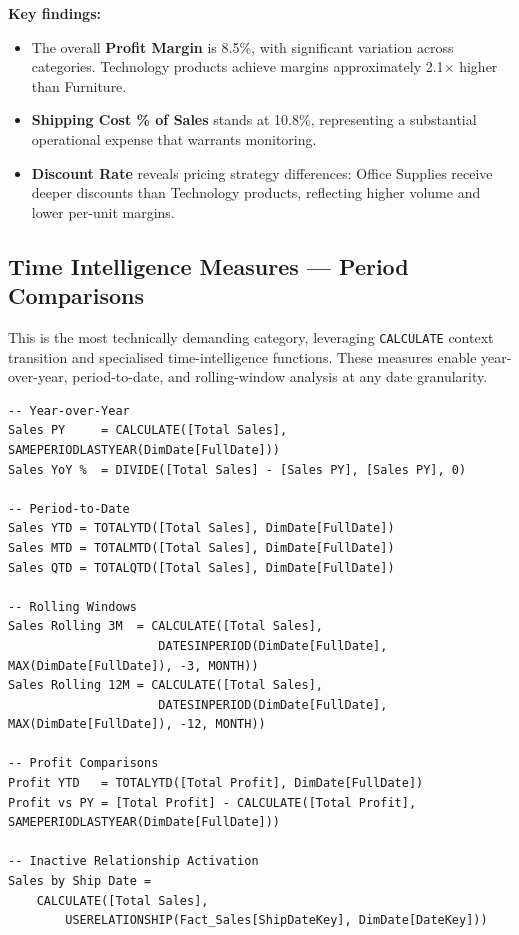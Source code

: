 \documentclass[11pt,a4paper]{article}
\begin{document}
\textbf{Key findings:}
\begin{itemize}
    \item The overall \textbf{Profit Margin} is 8.5\%, with significant variation across categories. Technology products achieve margins approximately 2.1$\times$ higher than Furniture.
    \item \textbf{Shipping Cost \% of Sales} stands at 10.8\%, representing a substantial operational expense that warrants monitoring.
    \item \textbf{Discount Rate} reveals pricing strategy differences: Office Supplies receive deeper discounts than Technology products, reflecting higher volume and lower per-unit margins.
\end{itemize}

\subsection{Time Intelligence Measures --- Period Comparisons}

This is the most technically demanding category, leveraging \texttt{CALCULATE} context transition and specialised time-intelligence functions. These measures enable year-over-year, period-to-date, and rolling-window analysis at any date granularity.

\begin{lstlisting}
-- Year-over-Year
Sales PY     = CALCULATE([Total Sales], SAMEPERIODLASTYEAR(DimDate[FullDate]))
Sales YoY %  = DIVIDE([Total Sales] - [Sales PY], [Sales PY], 0)

-- Period-to-Date
Sales YTD = TOTALYTD([Total Sales], DimDate[FullDate])
Sales MTD = TOTALMTD([Total Sales], DimDate[FullDate])
Sales QTD = TOTALQTD([Total Sales], DimDate[FullDate])

-- Rolling Windows
Sales Rolling 3M  = CALCULATE([Total Sales],
                     DATESINPERIOD(DimDate[FullDate], MAX(DimDate[FullDate]), -3, MONTH))
Sales Rolling 12M = CALCULATE([Total Sales],
                     DATESINPERIOD(DimDate[FullDate], MAX(DimDate[FullDate]), -12, MONTH))

-- Profit Comparisons
Profit YTD   = TOTALYTD([Total Profit], DimDate[FullDate])
Profit vs PY = [Total Profit] - CALCULATE([Total Profit], SAMEPERIODLASTYEAR(DimDate[FullDate]))

-- Inactive Relationship Activation
Sales by Ship Date =
    CALCULATE([Total Sales],
        USERELATIONSHIP(Fact_Sales[ShipDateKey], DimDate[DateKey]))
\end{lstlisting}
\end{document}
